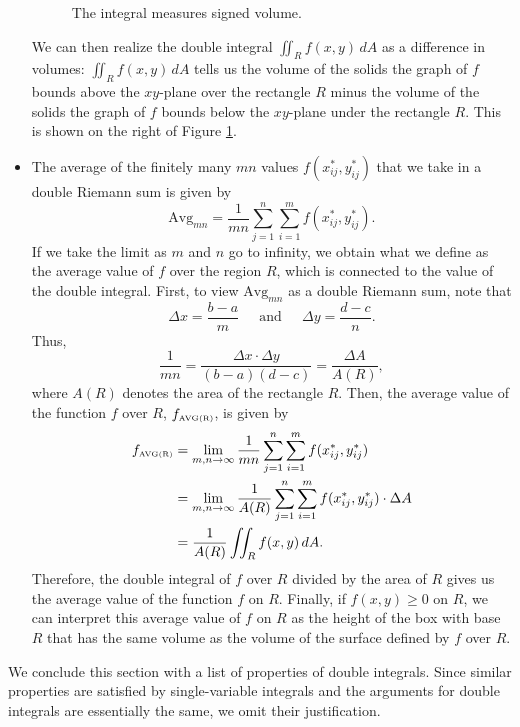 \begin{itemize}
\begin{figure}[ht]
\begin{center}
  \end{center}
  \caption{The integral measures signed volume.}
  \label{F:11.1.signed}
\end{figure}
We can then realize the double integral $\iint_R
f(x,y) \, dA$ as a difference in volumes: $\iint_R f(x,y) \, dA$ tells us
the volume of the solids the graph of $f$ bounds above the $xy$-plane
over the rectangle $R$ minus the volume of the solids the graph of $f$
bounds below the $xy$-plane under the rectangle $R$.  This is shown on
the right of Figure \ref{F:11.1.signed}.



\item The average of the finitely many $mn$ values $f(x_{ij}^*, y_{ij}^*)$ that we take in a double Riemann sum is given by
\[\mbox{Avg}_{mn} = \frac{1}{mn} \sum_{j=1}^n \sum_{i=1}^m f(x_{ij}^*, y_{ij}^*).\]
If we take the limit as $m$ and $n$ go to infinity, we obtain what we define as the average value of $f$ over the region $R$, which is connected to the value of the double integral. First, to view $\text{Avg}_{mn}$ as a double Riemann sum, note that
\[\Delta x = \frac{b-a}{m} \ \ \ \ \ \text{ and } \ \ \ \ \ \Delta y = \frac{d-c}{n}.\]
Thus,
\[\frac{1}{mn} = \frac{\Delta x \cdot \Delta y}{(b-a)(d-c)} = \frac{\Delta A}{A(R)},\]
where $A(R)$ denotes the area of the rectangle $R$. Then, the average value of the function $f$ over $R$, $f_{\mbox{\tiny{AVG}(R)}}$, is given by
\begin{align*}
f_{\mbox{\tiny{AVG}(R)}} & = \lim_{m,n \to \infty} \frac{1}{mn} \sum_{j=1}^n \sum_{i=1}^m f(x_{ij}^*, y_{ij}^*) \\
				    & = \lim_{m,n \to \infty} \frac{1}{A(R)} \sum_{j=1}^n \sum_{i=1}^m f(x_{ij}^*, y_{ij}^*) \cdot \Delta A \\
				    & = \frac{1}{A(R)} \iint_R f(x,y) \, dA.
\end{align*}
Therefore, the double integral of $f$ over $R$ divided by the area of $R$ gives us the average value of the function $f$ on $R$. Finally, if $f(x, y) \geq  0$ on $R$, we can interpret this average value of $f$ on $R$ as the height of the box with base $R$ that has the same volume as the volume of the surface defined by $f$ over $R$.
\end{itemize}







We conclude this section with a list of properties of double integrals. Since similar properties are satisfied by single-variable integrals and the arguments for double integrals are essentially the same, we omit their justification.

